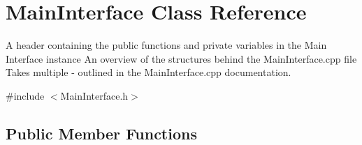 \hypertarget{class_main_interface}{}\section{Main\+Interface Class Reference}
\label{class_main_interface}


A header containing the public functions and private variables in the Main Interface instance  An overview of the structures behind the Main\+Interface.\+cpp file  Takes multiple -\/ outlined in the Main\+Interface.\+cpp documentation.  




{\ttfamily \#include $<$Main\+Interface.\+h$>$}

\subsection*{Public Member Functions}
